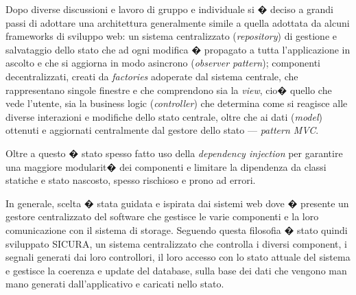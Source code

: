 \documentclass[final, smallexted]{svjour3}
\begin{document}
Dopo diverse discussioni e lavoro di gruppo e individuale si � deciso a grandi passi di adottare una architettura generalmente simile a quella adottata da alcuni frameworks di sviluppo web: un sistema centralizzato (\textit{repository}) di gestione e salvataggio dello stato che ad ogni modifica � propagato a tutta l'applicazione in ascolto e che si aggiorna in modo asincrono (\textit{observer pattern}); componenti decentralizzati, creati da \textit{factories} adoperate dal sistema centrale, che rappresentano singole finestre e che comprendono sia la \textit{view}, cio� quello che vede l'utente, sia la business logic (\textit{controller}) che determina come si reagisce alle diverse interazioni e modifiche dello stato centrale, oltre che ai dati (\textit{model}) ottenuti e aggiornati centralmente dal gestore dello stato --- \textit{pattern MVC}.

Oltre a questo � stato spesso fatto uso della \textit{dependency injection} per garantire una maggiore modularit� dei componenti e limitare la dipendenza da classi statiche e stato nascosto, spesso rischioso e prono ad errori.

In generale, scelta � stata guidata e ispirata dai sistemi web dove � presente un gestore centralizzato del software che gestisce le varie componenti e la loro comunicazione con il sistema di storage. Seguendo questa filosofia � stato quindi sviluppato SICURA, un sistema centralizzato che controlla i diversi component, i segnali generati dai loro controllori, il loro accesso con lo stato attuale del sistema e gestisce la coerenza e update del database, sulla base dei dati che vengono man mano generati dall'applicativo e caricati nello stato.
\end{document}
